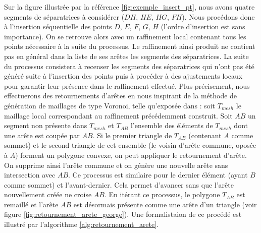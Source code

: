 Sur la figure illustrée par la référence \ref{fig:exemple_insert_pt}, nous avons quatre segments de séparatrices à considérer ($DH$, $HE$, $HG$, $FH$). Nous procédons donc à l'insertion séquentielle des points $D$, $E$, $F$, $G$, $H$ (l'ordre d'insertion est sans importance). On se retrouve alors avec un raffinement local contenant tous les points nécessaire à la suite du processus. Le raffinement ainsi produit ne contient pas en général dans la liste de ses arêtes les segments des séparatrices. La suite du processus consistera à recenser les segments des séparatrices qui n'ont pas été généré suite à l'insertion des points puis à procéder à des ajustements locaux pour garantir leur présence dans le raffinement effectué. Plus précisement, nous effectuerons des retournements d'arêtes en nous inspirant de la méthode de génération de maillages de type Voronoi, telle qu'exposée dans \cite{georgegeneration}: soit $T_{mesh}$ le maillage local correspondant au raffinement précédemment construit. Soit $AB$ un segment non présente dans $T_{mesh}$ et $T_{AB}$ l'ensemble des éléments de $T_{mesh}$ dont une arête est coupée par $AB$. Si le premier triangle de $T_{AB}$ (contenant $A$ comme sommet) et le second triangle de cet ensemble (le voisin d'arête commune, oposée à $A$) forment un polygone convexe, on peut appliquer le retournement d'arête. On supprime ainsi l'arête commune et on génère une nouvelle arête sans intersection avec $AB$. Ce processus est similaire pour le dernier élément (ayant $B$ comme sommet) et l'avant-dernier. Cela permet d'avancer sans que l'arête nouvellement créée ne croise $AB$. En itérant ce processus, le polygone $T_{AB}$ est remaillé et l'arête $AB$ est désormais présente comme une arête d'un triangle (voir figure \ref{fig:retournement_arete_george}). Une formalistaion de ce procédé est illustré par l'algorithme \ref{alg:retournement_arete}.

